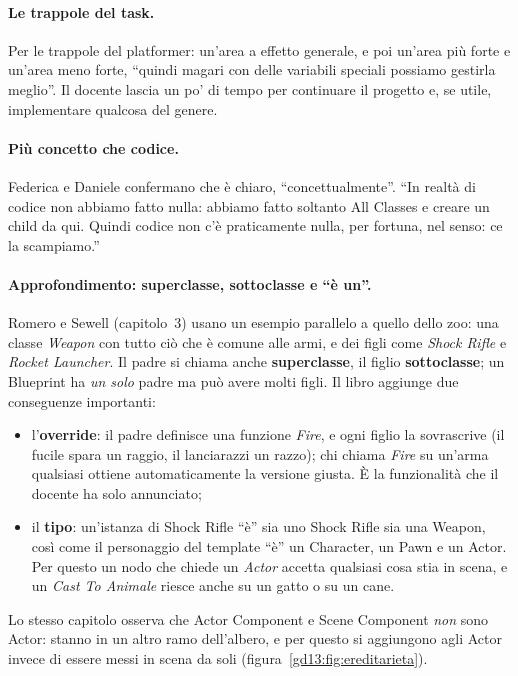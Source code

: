 \paragraph{Le trappole del task.} Per le trappole del platformer: un'area a
effetto generale, e poi un'area più forte e un'area meno forte, ``quindi magari
con delle variabili speciali possiamo gestirla meglio''. Il docente lascia un po'
di tempo per continuare il progetto e, se utile, implementare qualcosa del
genere.

\paragraph{Più concetto che codice.} Federica e Daniele confermano che è chiaro,
``concettualmente''. ``In realtà di codice non abbiamo fatto nulla: abbiamo fatto
soltanto All Classes e creare un child da qui. Quindi codice non c'è praticamente
nulla, per fortuna, nel senso: ce la scampiamo.''

\paragraph{Approfondimento: superclasse, sottoclasse e ``è un''.} Romero e
Sewell (capitolo~3) usano un esempio parallelo a quello dello zoo: una classe
\emph{Weapon} con tutto ciò che è comune alle armi, e dei figli come
\emph{Shock Rifle} e \emph{Rocket Launcher}. Il padre si chiama anche
\textbf{superclasse}, il figlio \textbf{sottoclasse}; un Blueprint ha \emph{un
solo} padre ma può avere molti figli. Il libro aggiunge due conseguenze
importanti:
\begin{itemize}
  \item l'\textbf{override}: il padre definisce una funzione \emph{Fire}, e ogni
        figlio la sovrascrive (il fucile spara un raggio, il lanciarazzi un
        razzo); chi chiama \emph{Fire} su un'arma qualsiasi ottiene
        automaticamente la versione giusta. È la funzionalità che il docente ha
        solo annunciato;
  \item il \textbf{tipo}: un'istanza di Shock Rifle ``è'' sia uno Shock Rifle
        sia una Weapon, così come il personaggio del template ``è'' un
        Character, un Pawn e un Actor. Per questo un nodo che chiede un
        \emph{Actor} accetta qualsiasi cosa stia in scena, e un \emph{Cast To
        Animale} riesce anche su un gatto o su un cane.
\end{itemize}
Lo stesso capitolo osserva che Actor Component e Scene Component \emph{non} sono
Actor: stanno in un altro ramo dell'albero, e per questo si aggiungono agli
Actor invece di essere messi in scena da soli
(figura~\ref{gd13:fig:ereditarieta}).

